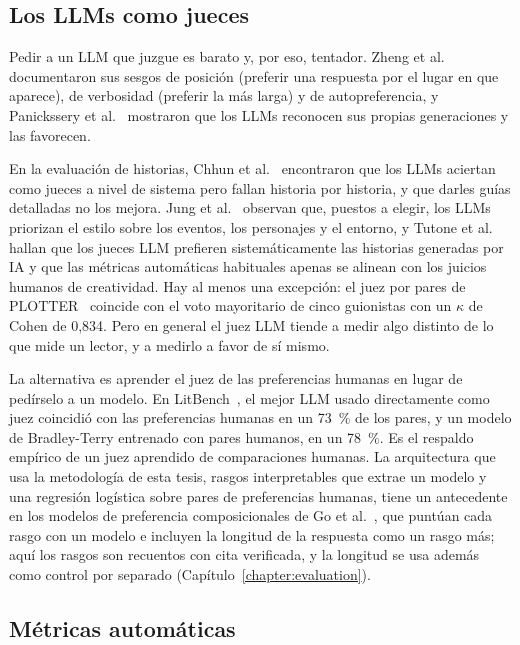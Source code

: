 \subsection{Los LLMs como jueces}\label{sec:jueces-llm}

Pedir a un LLM que juzgue es barato y, por eso, tentador. Zheng et al.~\cite{zheng2023} documentaron
sus sesgos de posición (preferir una respuesta por el lugar en que aparece), de verbosidad (preferir
la más larga) y de autopreferencia, y Panickssery et al.~\cite{panickssery2024} mostraron que los
LLMs reconocen sus propias generaciones y las favorecen.

En la evaluación de historias, Chhun et
al.~\cite{chhun2024} encontraron que los LLMs aciertan como jueces a nivel de sistema pero fallan
historia por historia, y que darles guías detalladas no los mejora. Jung et al.~\cite{jung2025}
observan que, puestos a elegir, los LLMs priorizan el estilo sobre los eventos, los personajes y el
entorno, y Tutone et al.~\cite{tutone2026} hallan que los jueces LLM prefieren sistemáticamente las
historias generadas por IA y que las métricas automáticas habituales apenas se alinean con los
juicios humanos de creatividad. Hay al menos una excepción: el juez por pares de
PLOTTER~\cite{gu2026} coincide con el voto mayoritario de cinco guionistas con un $\kappa$ de Cohen
de 0,834. Pero en general el juez LLM tiende a medir algo distinto de lo que mide un lector, y a
medirlo a favor de sí mismo.

La alternativa es aprender el juez de las preferencias humanas en lugar de pedírselo a un modelo. En
LitBench~\cite{fein2026}, el mejor LLM usado directamente como juez coincidió con las preferencias
humanas en un 73~\% de los pares, y un modelo de Bradley-Terry entrenado con pares humanos, en un
78~\%. %
Es el respaldo empírico de un juez aprendido de comparaciones humanas. La arquitectura que usa la
metodología de esta tesis, rasgos interpretables que extrae un modelo y una regresión logística sobre
pares de preferencias humanas, tiene un antecedente en los modelos de preferencia composicionales de
Go et al.~\cite{go2024}, que puntúan cada rasgo con un modelo e incluyen la longitud de la respuesta
como un rasgo más; aquí los rasgos son recuentos con cita verificada, y la longitud se usa además como
control por separado (Capítulo~\ref{chapter:evaluation}).

\subsection{Métricas automáticas}\label{sec:metricas-automaticas}

